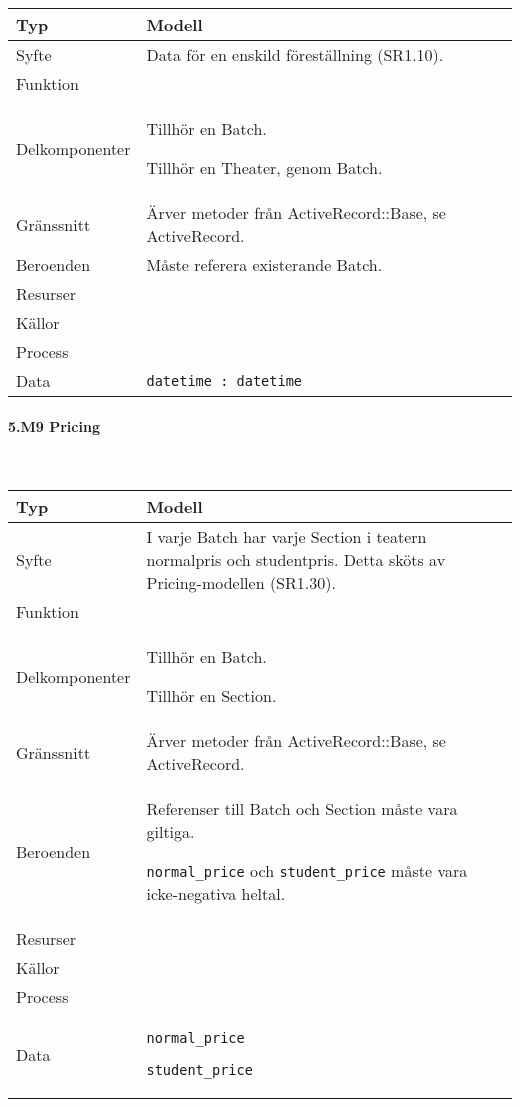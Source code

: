 \documentclass[a4paper, twoside, 11pt, titlepage]{article}
\begin{document}
			\begin {table} [ht] \begin{tabular} {  p{3.5cm} p{9.6cm} }
				\hline
				{Typ} & {Modell} \\
				\hline
				{Syfte} & {Data för en enskild föreställning (SR1.10).} \\
				\hline
				{Funktion} & { } \\
				\hline
				{Delkomponenter} & {Tillhör en Batch.

Tillhör en Theater, genom Batch.} \\
				\hline
				{Gränssnitt} & {Ärver metoder från ActiveRecord::Base, se ActiveRecord.} \\
				\hline
				{Beroenden} & {Måste referera existerande Batch.} \\
				\hline
				{Resurser} & { } \\
				\hline
				{Källor} & { } \\
				\hline
				{Process} & { } \\
				\hline
				{Data} & {{\tt datetime : datetime}} \\
				\hline
			\end{tabular} \end{table} \FloatBarrier


			\paragraph{5.M9 Pricing}\

			\begin {table} [ht] \begin{tabular} {  p{3.5cm} p{9.6cm} }
				\hline
				{Typ} & {Modell} \\
				\hline
				{Syfte} & {I varje Batch har varje Section i teatern normalpris och studentpris. Detta sköts av Pricing-modellen (SR1.30).} \\
				\hline
				{Funktion} & { } \\
				\hline
				{Delkomponenter} & {Tillhör en Batch.

Tillhör en Section.} \\
				\hline
				{Gränssnitt} & {Ärver metoder från ActiveRecord::Base, se ActiveRecord.} \\
				\hline
				{Beroenden} & {Referenser till Batch och Section måste vara giltiga.

{\tt normal\_price} och {\tt student\_price} måste vara icke-negativa heltal.} \\
				\hline
				{Resurser} & { } \\
				\hline
				{Källor} & { } \\
				\hline
				{Process} & { } \\
				\hline
				{Data} & {{\tt normal\_price}

{\tt student\_price}} \\
				\hline
			\end{tabular} \end{table} \FloatBarrier
\end{document}
